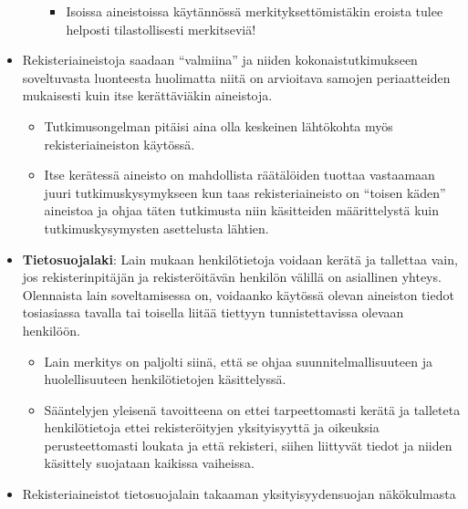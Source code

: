 \documentclass[
]{book}
\providecommand{\tightlist}{%
  \setlength{\itemsep}{0pt}\setlength{\parskip}{0pt}}
\begin{document}
\begin{itemize}
\begin{itemize}
    \begin{itemize}
    \tightlist
    \item
      Isoissa aineistoissa käytännössä merkityksettömistäkin eroista tulee helposti tilastollisesti merkitseviä!
    \end{itemize}
  \end{itemize}
\item
  Rekisteriaineistoja saadaan ``valmiina'' ja niiden kokonaistutkimukseen soveltuvasta luonteesta huolimatta niitä on arvioitava samojen periaatteiden mukaisesti kuin itse kerättäviäkin aineistoja.

  \begin{itemize}
  \tightlist
  \item
    Tutkimusongelman pitäisi aina olla keskeinen lähtökohta myös rekisteriaineiston käytössä.
  \item
    Itse kerätessä aineisto on mahdollista räätälöiden tuottaa vastaamaan juuri tutkimuskysymykseen kun taas rekisteriaineisto on ``toisen käden'' aineistoa ja ohjaa täten tutkimusta niin käsitteiden määrittelystä kuin tutkimuskysymysten asettelusta lähtien.
  \end{itemize}
\item
  \textbf{Tietosuojalaki}: Lain mukaan henkilötietoja voidaan kerätä ja tallettaa vain, jos rekisterinpitäjän ja rekisteröitävän henkilön välillä on asiallinen yhteys. Olennaista lain soveltamisessa on, voidaanko käytössä olevan aineiston tiedot tosiasiassa tavalla tai toisella liitää tiettyyn tunnistettavissa olevaan henkilöön.

  \begin{itemize}
  \tightlist
  \item
    Lain merkitys on paljolti siinä, että se ohjaa suunnitelmallisuuteen ja huolellisuuteen henkilötietojen käsittelyssä.
  \item
    Sääntelyjen yleisenä tavoitteena on ettei tarpeettomasti kerätä ja talleteta henkilötietoja ettei rekisteröityjen yksityisyyttä ja oikeuksia perusteettomasti loukata ja että rekisteri, siihen liittyvät tiedot ja niiden käsittely suojataan kaikissa vaiheissa.
  \end{itemize}
\item
  Rekisteriaineistot tietosuojalain takaaman yksityisyydensuojan näkökulmasta


\end{itemize}
\end{document}
